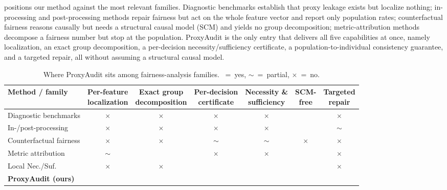 \documentclass[sn-mathphys-num]{sn-jnl}
\newcommand{\cmark}{{\color{aftergreen}\checkmark}}
\newcommand{\xmark}{{\color{proxyred}\(\boldsymbol\times\)}}
\newcommand{\pmark}{{\color{black!55}$\sim$}}
\begin{document}
 positions our method against the most relevant
families. Diagnostic benchmarks establish that proxy leakage exists but localize
nothing; in-processing and post-processing methods repair fairness but act on the
whole feature vector and report only population rates; counterfactual fairness
reasons causally but needs a structural causal model (SCM) and yields no group
decomposition; metric-attribution methods decompose a fairness number but stop at
the population. ProxyAudit is the only entry that delivers all five capabilities
at once, namely localization, an exact group decomposition, a per-decision
necessity/sufficiency certificate, a population-to-individual consistency
guarantee, and a targeted repair, all without assuming a structural causal model.

\begin{table}[tbp]
\centering
\caption{Where ProxyAudit sits among fairness-analysis families. \cmark{}~=~yes,
\pmark{}~=~partial, \xmark{}~=~no.}
\label{tab:capabilities}
\small
\setlength{\tabcolsep}{4.5pt}
\begin{tabular}{lcccccc}
\toprule
\textbf{Method / family} & \shortstack{Per-feature\\localization} & \shortstack{Exact group\\decomposition} & \shortstack{Per-decision\\certificate} & \shortstack{Necessity \&\\sufficiency} & \shortstack{SCM-\\free} & \shortstack{Targeted\\repair}\\
\midrule
Diagnostic benchmarks \cite{pena2020faircv,vladimirova2024fairjob} & \xmark & \xmark & \xmark & \xmark & \cmark & \xmark\\
In-/post-processing \cite{agarwal2018reductions,hardt2016equality} & \xmark & \xmark & \xmark & \xmark & \cmark & \pmark\\
Counterfactual fairness \cite{kusner2017counterfactual} & \xmark & \xmark & \pmark & \pmark & \xmark & \xmark\\
Metric attribution \cite{begley2020explainability} & \pmark & \cmark & \xmark & \xmark & \cmark & \xmark\\
Local Nec./Suf.\ \cite{watson2021local} & \xmark & \xmark & \cmark & \cmark & \cmark & \xmark\\
\textbf{ProxyAudit (ours)} & \cmark & \cmark & \cmark & \cmark & \cmark & \cmark\\
\bottomrule
\end{tabular}
\end{table}
\end{document}
